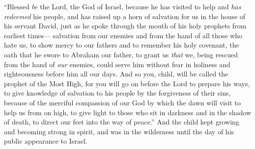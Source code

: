 \begin{biblechapter}
\verse “Blessed \textit{be} the Lord, the God of Israel, 
because he has visited to help and \textit{has redeemed} his people,
\verse and has raised up a horn of salvation for us 
in the house of his servant David,
\verse just as he spoke through the mouth of his holy prophets from earliest times—
\verse salvation from our enemies and from the hand of all those who hate us,
\verse to show mercy to our fathers 
and to remember his holy covenant,
\verse the oath that he swore to Abraham our father, 
to grant us
\verse \textit{that} we, being rescued from the hand of \textit{our} enemies, 
could serve him without fear
\verse in holiness and righteousness 
before him all our days.
\verse And so you, child, will be called the prophet of the Most High, 
for you will go on before the Lord to prepare his ways,
\verse to give knowledge of salvation to his people 
by the forgiveness of their sins,
\verse because of the merciful compassion of our God 
by which the dawn will visit to help us from on high,
\verse to give light to those who sit in darkness and in the shadow of death, 
to direct our feet into the way of peace.”
\verse And the child kept growing and becoming strong in spirit, and was in the wilderness until the day of his public appearance to Israel.
\end{biblechapter}


